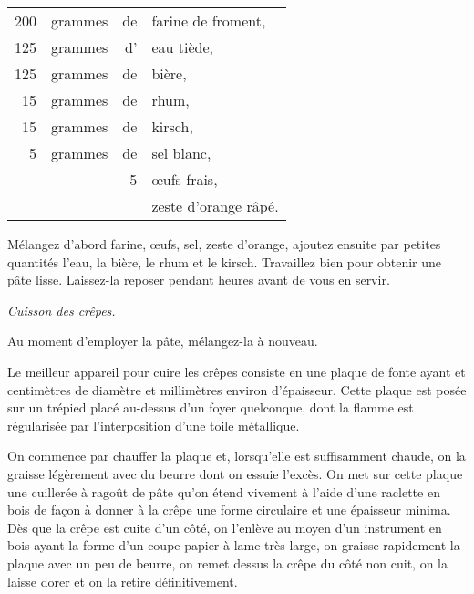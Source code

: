 \footnotesize
\begin{longtable}{rrrp{16em}}
    200 & grammes & de & farine de froment,                                                               \\
    125 & grammes & d' & eau tiède,                                                                       \\
    125 & grammes & de & bière,                                                                           \\
     15 & grammes & de & rhum,                                                                            \\
     15 & grammes & de & kirsch,                                                                          \\
      5 & grammes & de & sel blanc,                                                                       \\
        &         &  5 & œufs frais,                                                                      \\
        &         &    & zeste d'orange râpé.                                                             \\
\end{longtable}
\normalsize

Mélangez d'abord farine, œufs, sel, zeste d'orange, ajoutez ensuite par petites
quantités l'eau, la bière, le rhum et le kirsch. Travaillez bien pour obtenir
une pâte lisse. Laissez-la reposer pendant {\mmm} heures avant de vous en
servir.

\medskip

\textit{Cuisson des crêpes. }

\medskip

Au moment d'employer la pâte, mélangez-la à nouveau.

Le meilleur appareil pour cuire les crêpes consiste en une plaque de fonte
ayant {\mmm} et {\mmm} centimètres de diamètre et {\mmm}
millimètres environ d'épaisseur. Cette plaque est posée sur un trépied placé
au-dessus d’un foyer quelconque, dont la flamme est régularisée par
l'interposition d'une toile métallique.

On commence par chauffer la plaque et, lorsqu'elle est suffisamment chaude, on
la graisse légèrement avec du beurre dont on essuie l'excès. On met sur cette
plaque une cuillerée à ragoût de pâte qu'on étend vivement à l’aide d'une
raclette en bois de façon à donner à la crêpe une forme circulaire et une
épaisseur minima. Dès que la crêpe est cuite d'un côté, on l'enlève au moyen
d'un instrument en bois ayant la forme d'un coupe-papier à lame très-large, on
graisse rapidement la plaque avec un peu de beurre, on remet dessus la crêpe du
côté non cuit, on la laisse dorer et on la retire définitivement.

